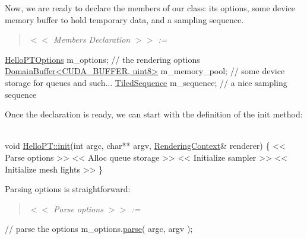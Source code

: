 \begin{DoxyParagraph}{}
Now, we are ready to declare the members of our class\+: its options, some device memory buffer to hold temporary data, and a sampling sequence. ~\newline
\label{_hello_renderer_page_Members_Declaration_anchor}%
%
 \begin{quote}
{\itshape  $<$$<$ Members Declaration $>$$>$ \+:= }

\end{quote}

\begin{DoxyCode}
\hyperlink{struct_hello_p_t_options}{HelloPTOptions}                      m\_options;      \textcolor{comment}{// the rendering options}
\hyperlink{class_domain_buffer}{DomainBuffer<CUDA\_BUFFER, uint8>}    m\_memory\_pool;  \textcolor{comment}{// some device storage
       for queues and such...}
\hyperlink{struct_tiled_sequence}{TiledSequence}                       m\_sequence;     \textcolor{comment}{// a nice sampling sequence}
\end{DoxyCode}

\end{DoxyParagraph}
\begin{DoxyParagraph}{}
Once the declaration is ready, we can start with the definition of the init method\+: ~\newline

\begin{DoxyCode}
\textcolor{keywordtype}{void} \hyperlink{struct_hello_p_t_a8ec59e3fac8eff801cecdd3220cd8d41}{HelloPT::init}(\textcolor{keywordtype}{int} argc, \textcolor{keywordtype}{char}** argv, \hyperlink{struct_rendering_context}{RenderingContext}& renderer)
\{
    << Parse options >>
    << Alloc queue storage >>
    << Initialize sampler >>
    << Initialize mesh lights >>
\}
\end{DoxyCode}

\end{DoxyParagraph}
\begin{DoxyParagraph}{}
Parsing options is straightforward\+: ~\newline
\label{_hello_renderer_page_Parse_options_anchor}%
%
 \begin{quote}
{\itshape  $<$$<$ Parse options $>$$>$ \+:= }

\end{quote}

\begin{DoxyCode}
\textcolor{comment}{// parse the options}
m\_options.\hyperlink{struct_hello_p_t_options_a540d006dee6aff8ee5e8b3cfc8b0fa0b}{parse}( argc, argv );
\end{DoxyCode}

\end{DoxyParagraph}
